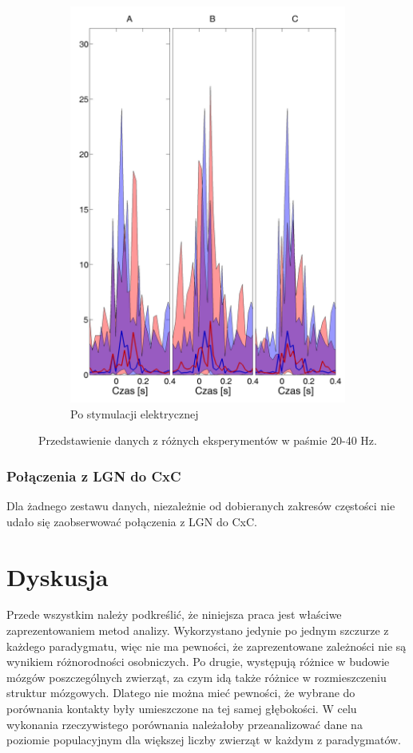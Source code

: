 \documentclass{pracamgr}
\begin{document}
\begin{figure}[h]
\begin{subfigure}{.5\textwidth}
			\includegraphics[width=1.\linewidth]{beta3_20-40_z_SC2_do_CxC82.png}
			\caption{Po stymulacji elektrycznej}
			\label{rys:20_40_beta_SC_CxC}
		\end{subfigure}
		\caption{Przedstawienie danych z różnych eksperymentów w paśmie 20-40 Hz.}
		\label{rys:20_40_SC_CxC}
	\end{figure}
	\FloatBarrier
	\subsection{Połączenia z LGN do CxC}
	Dla żadnego zestawu danych, niezależnie od dobieranych zakresów częstości nie udało się zaobserwować połączenia z LGN do CxC.
	\chapter{Dyskusja}
	Przede wszystkim należy podkreślić, że niniejsza praca jest właściwe zaprezentowaniem metod analizy. Wykorzystano jedynie po jednym szczurze z każdego paradygmatu, więc nie ma pewności, że zaprezentowane zależności nie są wynikiem różnorodności osobniczych. Po drugie, występują różnice w budowie mózgów poszczególnych zwierząt, za czym idą także różnice w rozmieszczeniu struktur mózgowych. Dlatego nie można mieć pewności, że wybrane do porównania kontakty były umieszczone na tej samej głębokości. W celu wykonania rzeczywistego porównania należałoby przeanalizować dane na poziomie populacyjnym dla większej liczby zwierząt w każdym z paradygmatów.
	
\end{document}
